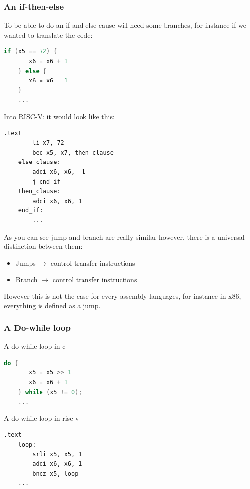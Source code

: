 	\subsubsection{An if-then-else}
	To be able to do an if and else cause will need some branches, for instance if we wanted to translate the code:
	\begin{lstlisting}[language=c]
	if (x5 == 72) {
	   x6 = x6 + 1
	} else {
	   x6 = x6 - 1
	}
	...
	\end{lstlisting}
	Into RISC-V: it would look like this:
	\begin{lstlisting}[language={[RISC-V]Assembler}]
	.text 
		li x7, 72
		beq x5, x7, then_clause
	else_clause:
		addi x6, x6, -1 
		j end_if
	then_clause:
		addi x6, x6, 1 
	end_if:
		...
	\end{lstlisting}
	As you can see jump and branch are really similar however, there is a universal distinction between them:
	\begin{itemize}
		\item Jumps $\to $  control transfer instructions
		\item Branch $\to $  control transfer instructions
	\end{itemize}
	However this is not the case for every assembly languages, for instance in x86, everything is defined as a jump.
	\subsubsection{A Do-while loop}
	\begin{center}
		A do while loop in c
	\end{center}

	\begin{lstlisting}[language=c]
	do {
	   x5 = x5 >> 1 
	   x6 = x6 + 1 
	} while (x5 != 0);
	...
	\end{lstlisting}

	\begin{center}
		A do while loop in risc-v
	\end{center}
	\begin{lstlisting}[language={[RISC-V]Assembler}]
	.text
	loop:
		srli x5, x5, 1 
		addi x6, x6, 1 
		bnez x5, loop 
	...
	\end{lstlisting}
